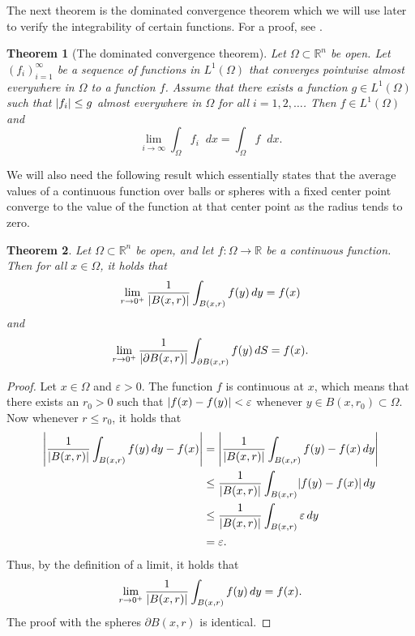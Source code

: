 \documentclass[english, 12pt, a4paper, sci, utf8, a-2b, online]{aaltothesis}
\theoremstyle{definition}
\theoremstyle{plain}
\newtheorem{theorem}{Theorem}[section]
\DeclarePairedDelimiter\abs{\lvert}{\rvert}
\newcommand*\diff{\mathop{}\!d}
\numberwithin{equation}{section}
\begin{document}
The next theorem is the dominated convergence theorem which we will use later
to verify the integrability of certain functions.
For a proof, see \cite[Theorem~2.24 on p.~54]{folland1999}.
\begin{theorem}[The dominated convergence theorem]
    \label{thm:dominated_convergence}
    Let $\Omega \subset \mathbb{R}^n$ be open.
    Let $(f_i)_{i=1}^{\infty}$ be a sequence of functions in $L^1(\Omega)$
    that converges pointwise almost everywhere in $\Omega$ to a function $f$.
    Assume that there exists a function $g \in L^1(\Omega)$ such that
    $\abs{f_i} \leq g$ almost everywhere in $\Omega$ for all $i=1,2,\dotsc$. Then
    $f \in L^1(\Omega)$ and
    \begin{equation*}
        \lim_{i \to \infty} \int_{\Omega} f_i \diff x
        = \int_{\Omega} f \diff x.
    \end{equation*}
\end{theorem}

We will also need the following result which essentially states that
the average values of a continuous function over balls or spheres
with a fixed center point
converge to the value of the function at that center point as the radius tends to zero.
\begin{theorem}
    \label{thm:lebesgue_differentiation_theorem}
    Let $\Omega \subset \mathbb{R}^n$ be open, and
    let $f: \Omega \to \mathbb{R}$ be a continuous function.
    Then for all $x \in \Omega$, it holds that
    \begin{equation*}
        \lim_{r \to 0^+}
            \frac{1}{\abs{B(x,r)}}
                \int_{B(x,r)} f(y) \diff y = f(x)
    \end{equation*}
    and
    \begin{equation*}
        \lim_{r \to 0^+}
            \frac{1}{\abs{\partial B(x,r)}}
                \int_{\partial B(x,r)} f(y) \diff S = f(x).
    \end{equation*}
\end{theorem}
\begin{proof}
    Let $x \in \Omega$ and $\varepsilon > 0$.
    The function $f$ is continuous at $x$, which means that there exists
    an $r_0 > 0$ such that $\abs{f(x)-f(y)} < \varepsilon$ whenever
    $y \in B(x,r_0) \subset \Omega$. Now whenever $r \leq r_0$, it holds that
    \begin{align*}
        \abs*{\frac{1}{\abs{B(x,r)}} \int_{B(x,r)} f(y) \diff y - f(x)}
        &= \abs*{\frac{1}{\abs{B(x,r)}} \int_{B(x,r)} f(y) - f(x) \diff y} \\
        &\leq \frac{1}{\abs{B(x,r)}} \int_{B(x,r)} \abs{f(y) - f(x)} \diff y \\
        &\leq \frac{1}{\abs{B(x,r)}} \int_{B(x,r)} \varepsilon \diff y \\
        &= \varepsilon.
    \end{align*}
    Thus, by the definition of a limit, it holds that
    \begin{equation*}
        \lim_{r \to 0^+}
            \frac{1}{\abs{B(x,r)}}
                \int_{B(x,r)} f(y) \diff y = f(x).
    \end{equation*}
    The proof with the spheres $\partial B(x,r)$ is identical.
\end{proof}
\end{document}
